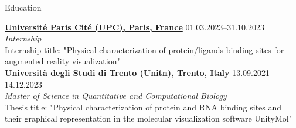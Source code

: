 \address{Address : Italy, Trento, Via della Malpensada 140}
\address{Mobile (Costa Rica) : (+506) 8714 4835, Mobile (Italy) : (+39) 371 5704162}
\address{Email : \href{mailto:diego.barqueromorera@studenti.unitn.it}{diego.barqueromorera@studenti.unitn.it} $\qquad$ \href{https://github.com/DiegoBarMor}{GitHub} $\qquad$ \href{https://www.linkedin.com/in/diego-barquero-morera-98863020b/}{LinkedIn}}




\begin{rSection}{Education}


	\vspace{\baselineskip}

	{\bf \href{https://u-paris.fr/en/}{Université Paris Cité (UPC), Paris, France}} \hfill {01.03.2023–31.10.2023} \\
	\textit{Internship}\\
	Internship title: "Physical characterization of protein/ligands binding sites for augmented reality visualization"\\

	{\bf \href{https://www.unitn.it/}{Università degli Studi di Trento (Unitn), Trento, Italy}} \hfill {13.09.2021-14.12.2023} \\
	\textit{Master of Science in Quantitative and Computational Biology}\\
	Thesis title: "Physical characterization of protein and RNA binding sites and their graphical representation in the molecular visualization software UnityMol"\\


\end{rSection}
